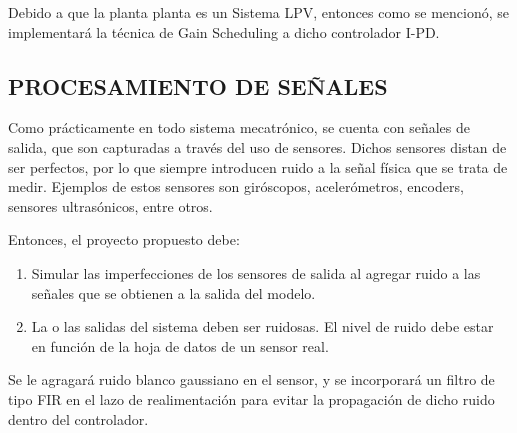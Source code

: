 \documentclass{article}
\begin{document}
\begin{sloppypar}
Debido a que la planta planta es un Sistema LPV, entonces como se mencionó, se implementará la técnica de Gain Scheduling a dicho controlador I-PD.





























\subsection{PROCESAMIENTO DE SEÑALES}
\label{sec:PROCESAMIENTO DE SEÑALES}

Como prácticamente en todo sistema mecatrónico, se cuenta con señales de salida, que son capturadas a través del uso de sensores. Dichos sensores distan de ser perfectos, por lo que siempre introducen ruido a la señal física que se trata de medir. Ejemplos de estos sensores son giróscopos, acelerómetros, encoders, sensores ultrasónicos, entre otros.

Entonces, el proyecto propuesto debe:

\begin{enumerate}

    \item Simular las imperfecciones de los sensores de salida al agregar ruido a las señales que se obtienen a la salida del modelo.

    \item La o las salidas del sistema deben ser ruidosas. El nivel de ruido debe estar en función de la hoja de datos de un sensor real.
\end{enumerate}

Se le agragará ruido blanco gaussiano en el sensor, y se incorporará un filtro de tipo FIR en el lazo de realimentación para evitar la propagación de dicho ruido dentro del controlador.




\end{sloppypar}
\end{document}
